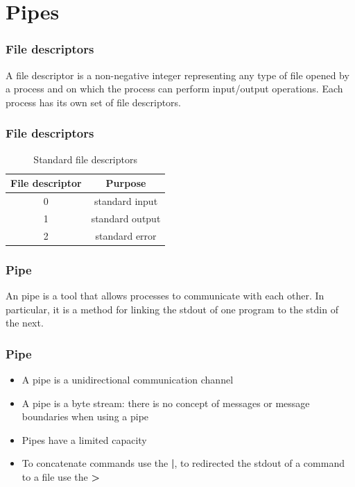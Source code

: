 \documentclass{beamer}
\begin{document}
\section{Pipes}

\begin{frame}
\frametitle{File descriptors}
\begin{definition}
A \alert{file descriptor} is a non-negative integer representing any type of file opened by a process and on which the process can perform input/output operations. Each process has its own set of file descriptors.
\end{definition}
\end{frame}

\begin{frame}
\frametitle{File descriptors}
\begin{table}[!h]
\begin{center}
\begin{tabular}{ cc } 
\hline
File descriptor & Purpose \\
\hline
0 & standard input \\
1 & standard output \\
2 & standard error \\
\hline
\end{tabular}
\caption{Standard file descriptors}
\end{center}
\end{table}
\end{frame}

\begin{frame}
\frametitle{Pipe}
\begin{definition}
An \alert{pipe} is a tool that allows processes to communicate with each other. In particular, it is a method for linking the stdout of one program to the stdin of the next.
\end{definition}
\end{frame}

\begin{frame}
\frametitle{Pipe}
\begin{itemize}
\item A pipe is a unidirectional communication channel
\item A pipe is a byte stream: there is no concept of messages or message boundaries when using a pipe
\item Pipes have a limited capacity
\item To concatenate commands use the \textbf{|}, to redirected the stdout of a command to a file use the \textbf{>}
\end{itemize}
\end{frame}
\end{document}
